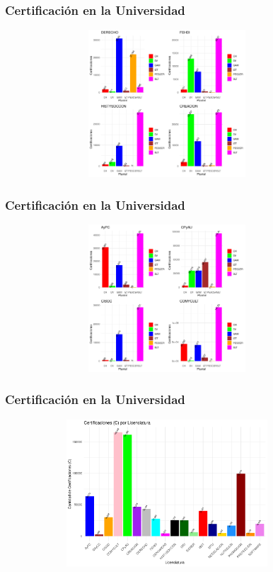 \documentclass[xcolor=dvipsnames]{beamer}
\begin{document}
\begin{frame}\frametitle{Certificaci\'on en la Universidad}
\textbf{
}
\begin{figure}[H]
\centering
\includegraphics[width=10cm,height=5.5cm]{Imagenes/GraficasCertificacionLicenciaturas4.pdf}
\end{figure}
\end{frame}



\begin{frame}\frametitle{Certificaci\'on en la Universidad}
\textbf{
}
\begin{figure}[H]
\centering
\includegraphics[width=10cm,height=5.5cm]{Imagenes/GraficasCertificacionLicenciaturas5.pdf}
\end{figure}
\end{frame}



\begin{frame}\frametitle{Certificaci\'on en la Universidad}
\textbf{
}
\begin{figure}[H]
\centering
\includegraphics[width=10cm,height=5.5cm]{Imagenes/graficoCertificacionFavorableLic.pdf}
\end{figure}
\end{frame}
\end{document}
